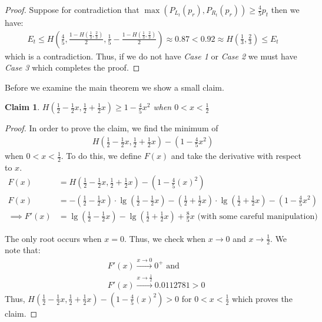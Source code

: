 \documentclass[letterpaper,12pt,titlepage,oneside,final]{book}
\theoremstyle{plain}
\begin{document}
\begin{proof}
Suppose for contradiction that $\max(P_{L_t}(p_r), P_{R_t}(p_r)) \geq \frac{4}{5} p_t$ then we have:
\begin{align*}
E_t \leq H(\frac{4}{5}, \frac{1-H(\frac{1}{3}, \frac{2}{3})}{2}, \frac{1}{5}-\frac{1-H(\frac{1}{3}, \frac{2}{3})}{2}) \approx 0.87 < 0.92 \approx H(\frac{1}{3}, \frac{2}{3}) \leq E_t
\end{align*}
which is a contradiction.
Thus, if we do not have \textit{Case 1} or \textit{Case 2} we must have \textit{Case 3} which completes the proof.



\end{proof}

Before we examine the main theorem we show a small claim.

\newtheorem{claim}{Claim}
\begin{claim}\label{Claim1}
$H(\frac{1}{2}-\frac{1}{2} x, \frac{1}{2} + \frac{1}{2} x) \geq 1- \frac{4}{5} x^2$ when $0 < x < \frac{1}{2}$
\end{claim}

\begin{proof}
In order to prove the claim, we find the minimum of
\begin{align*}
H(\frac{1}{2}-\frac{1}{2} x, \frac{1}{2} + \frac{1}{2} x) - (1 - \frac{4}{5} x^2) 
\end{align*}
when $0 < x < \frac{1}{2}$. To do this, we define $F(x)$ and take the derivative with respect to $x$.
\begin{align*}
F(x) &= H(\frac{1}{2}-\frac{1}{2} x, \frac{1}{2} + \frac{1}{2} x) - (1 - \frac{4}{5} (x)^2) \\
F(x) &= - (\frac{1}{2}-\frac{1}{2} x)\cdot \lg(\frac{1}{2}-\frac{1}{2} x) - (\frac{1}{2} + \frac{1}{2} x)\cdot\lg(\frac{1}{2} + \frac{1}{2} x) - (1 - \frac{4}{5} x^2) \\
\implies F'(x) &= \lg(\frac{1}{2}-\frac{1}{2} x) - \lg(\frac{1}{2} + \frac{1}{2} x) + \frac{8}{5}x \text{ (with some careful manipulation)}
\end{align*}

The only root occurs when $x = 0$. Thus, we check when $x \rightarrow 0$ and $x \rightarrow \frac{1}{2}$. We note that: \\
\begin{align*}
&F'(x) \xrightarrow{x \to 0} 0^{+}  \text{ and} \\
&F'(x) \xrightarrow{x \to \frac{1}{2}} 0.0112781 > 0
\end{align*}
Thus, $H(\frac{1}{2}-\frac{1}{2} x, \frac{1}{2} + \frac{1}{2} x) - (1 - \frac{4}{5} (x)^2) > 0$ for $ 0 < x < \frac{1}{2}$ which proves the claim.
\end{proof} 
\end{document}
